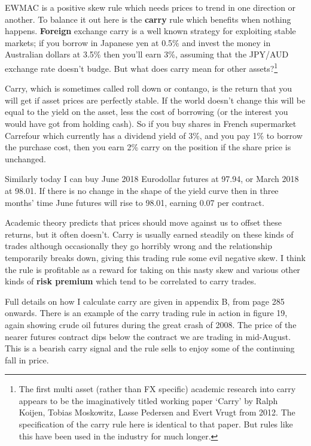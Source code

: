 EWMAC is a positive skew rule which needs prices to trend in one direction or another. To balance it out here is the \textbf{carry} rule which benefits when nothing happens. \textbf{Foreign} exchange carry is a well known strategy for exploiting stable markets; if you borrow in Japanese yen at 0.5\% and invest the money in Australian dollars at 3.5\% then you'll earn 3\%, assuming that the JPY/AUD exchange rate doesn't budge. But what does carry mean for other assets?\footnote{The first multi asset (rather than FX specific) academic research into carry appears to be the imaginatively titled working paper ‘Carry' by Ralph Koijen, Tobias Moskowitz, Lasse Pedersen and Evert Vrugt from 2012. The specification of the carry rule here is identical to that paper. But rules like this have been used in the industry for much longer.}

Carry, which is sometimes called roll down or contango, is the return that you will get if asset prices are perfectly stable. If the world doesn't change this will be equal to the yield on the asset, less the cost of borrowing (or the interest you would have got from holding cash). So if you buy shares in French supermarket Carrefour which currently has a dividend yield of 3\%, and you pay 1\% to borrow the purchase cost, then you earn 2\% carry on the position if the share price is unchanged.

Similarly today I can buy June 2018 Eurodollar futures at 97.94, or March 2018 at 98.01. If there is no change in the shape of the yield curve then in three months' time June futures will rise to 98.01, earning 0.07 per contract.

Academic theory predicts that prices should move against us to offset these returns, but it often doesn't. Carry is usually earned steadily on these kinds of trades although occasionally they go horribly wrong and the relationship temporarily breaks down, giving this trading rule some evil negative skew. I think the rule is profitable as a reward for taking on this nasty skew and various other kinds of \textbf{risk premium} which tend to be correlated to carry trades.

Full details on how I calculate carry are given in appendix B, from page 285 onwards. There is an example of the carry trading rule in action in figure 19, again showing crude oil futures during the great crash of 2008. The price of the nearer futures contract dips below the contract we are trading in mid-August. This is a bearish carry signal and the rule sells to enjoy some of the continuing fall in price.


